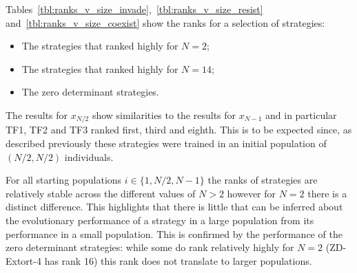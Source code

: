 \documentclass[10pt,letterpaper]{article}
\begin{document}
Tables~\ref{tbl:ranks_v_size_invade},~\ref{tbl:ranks_v_size_resist}
and~\ref{tbl:ranks_v_size_coexist} show the ranks for a selection of
strategies:

\begin{itemize}
    \item The strategies that ranked highly for \(N=2\);
    \item The strategies that ranked highly for \(N=14\);
    \item The zero determinant strategies.
\end{itemize}

The results for \(x_{N/2}\) show similarities to the results for \(x_{N-1}\) and
in particular TF1, TF2 and TF3 ranked first, third and eighth. This is to be
expected since, as described previously these strategies
were trained in an initial population of \((N/2, N/2)\) individuals.

For all starting populations
\(i\in\{1, N/2, N-1\}\) the ranks of strategies are relatively stable across the
different values of \(N>2\) however for \(N=2\) there is a distinct difference.
This highlights that there is little that can be inferred about the evolutionary
performance of a strategy in a large population from its performance in a small
population. This is confirmed by the performance of the zero determinant strategies: while
some do rank relatively highly for \(N=2\) (ZD-Extort-4 has rank 16) this rank
does not translate to larger populations.
\end{document}
